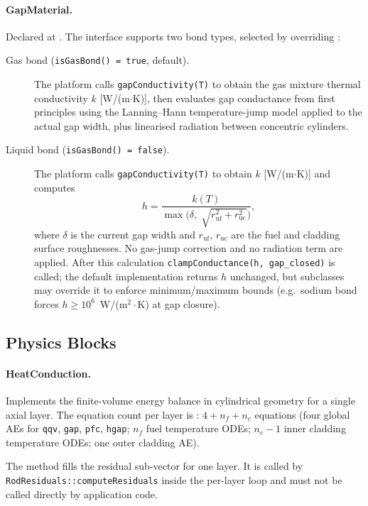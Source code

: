 \documentclass[11pt,a4paper]{article}
\begin{document}
\paragraph{GapMaterial.}
Declared at .  The interface supports two bond types, selected by overriding :
\begin{description}
  \item[Gas bond (\texttt{isGasBond() = true}, default).] The platform calls \texttt{gapConductivity(T)} to obtain the gas mixture thermal conductivity $k$ [W/(m$\cdot$K)], then evaluates gap conductance from first principles using the Lanning--Hann temperature-jump model applied to the actual gap width, plus linearised radiation between concentric cylinders.
  \item[Liquid bond (\texttt{isGasBond() = false}).] The platform calls \texttt{gapConductivity(T)} to obtain $k$ [W/(m$\cdot$K)] and computes
    \begin{equation*}
      h = \frac{k(T)}{\max\!\bigl(\delta,\;\sqrt{r_\mathrm{uf}^2+r_\mathrm{uc}^2}\bigr)},
    \end{equation*}
    where $\delta$ is the current gap width and $r_\mathrm{uf}$, $r_\mathrm{uc}$ are the fuel and cladding surface roughnesses.  No gas-jump correction and no radiation term are applied.  After this calculation \texttt{clampConductance(h, gap\_closed)} is called; the default implementation returns $h$ unchanged, but subclasses may override it to enforce minimum/maximum bounds (e.g.\ sodium bond forces $h \geq 10^6$~W/(m$^2\cdot$K) at gap closure).
\end{description}

\subsection{Physics Blocks}
\label{sec:physics_blocks}

\paragraph{HeatConduction.}
Implements the finite-volume energy balance in cylindrical geometry for a single axial layer.  The equation count per layer is : $4 + n_f + n_c$ equations (four global AEs for \texttt{qqv}, \texttt{gap}, \texttt{pfc}, \texttt{hgap}; $n_f$ fuel temperature ODEs; $n_c - 1$ inner cladding temperature ODEs; one outer cladding AE).

The method  fills the residual sub-vector for one layer.  It is called by \texttt{RodResiduals::computeResiduals} inside the per-layer loop and must not be called directly by application code.
\end{document}
